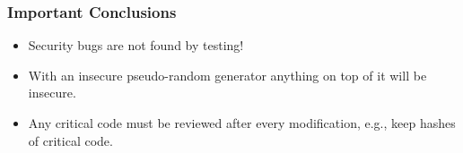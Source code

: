 \documentclass[a4paper]{scrartcl}
\begin{document}
\subsubsection*{Important Conclusions}

\begin{itemize}
\item Security bugs are not found by testing!
\item With an insecure pseudo-random generator anything on top of it will be insecure.
\item Any critical code must be reviewed after every modification, e.g., keep hashes of critical code.
\end{itemize}
\end{document}

